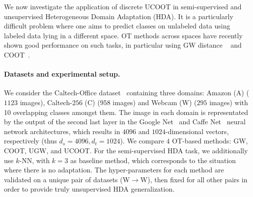 We now investigate the application of discrete UCOOT in semi-supervised and unsupervised
Heterogeneous Domain Adaptation (HDA). It is a particularly difficult problem where
one aims to predict classes on unlabeled data using labeled data lying in a different space.
OT methods across spaces have recently shown good performance on such tasks,
in particular using GW distance ~\citep{Yan18} and COOT~\citep{Redko20}.

\paragraph{Datasets and experimental setup.} We consider the Caltech-Office dataset~\citep{Saenko10}
containing three domains:
Amazon (A) ($1123$ images), Caltech-$256$ (C) ($958$ images) and Webcam (W) ($295$ images)
with 10 overlapping classes amongst them. The image in each domain is representated by
the output of the second last layer
in the Google Net~\citep{Szegedy15} and Caffe Net~\citep{Jia14} neural network architectures,
which results in $4096$ and $1024$-dimensional vectors, respectively (thus $d_s = 4096, d_t = 1024$).
We compare $4$ OT-based methods: GW, COOT, UGW, and UCOOT. For the semi-supervised HDA task,
we additionally use $k$-NN, with $k=3$ as baseline method, which corresponds to the situation where
there is no adaptation. The hyper-parameters for each method are validated on a
unique pair of datasets (W$\rightarrow$W),
then fixed for all other pairs in order to provide truly unsupervised HDA generalization.

